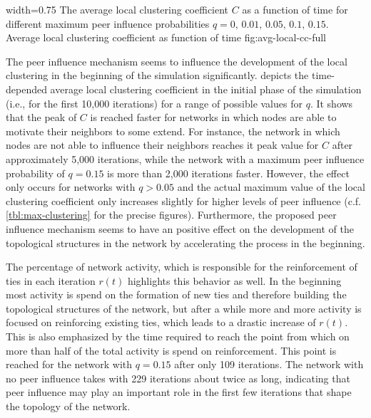      {width=0.75\textwidth}
      {The average local clustering coefficient \( C \) as a function of time for different maximum peer influence probabilities \( q = 0, \, 0.01, \, 0.05, \, 0.1, \, 0.15\). }
      {Average local clustering coefficient as function of time}
      {fig:avg-local-cc-full}


The peer influence mechanism seems to influence the development of the local clustering in the beginning of the simulation significantly.
 depicts the time-depended average local clustering coefficient in the initial phase of the simulation (i.e., for the first 10,000 iterations) for a range of possible values for \( q \).
It shows that the peak of \( C \) is reached faster for networks in which nodes are able to motivate their neighbors to some extend.
For instance, the network in which nodes are not able to influence their neighbors reaches it peak value for \( C \) after approximately 5,000 iterations, while the network with a maximum peer influence probability of \( q = 0.15 \) is more than 2,000 iterations faster.
However, the effect only occurs for networks with \( q > 0.05 \) and the actual maximum value of the local clustering coefficient only increases slightly for higher levels of peer influence (c.f. \cref{tbl:max-clustering} for the precise figures).
Furthermore, the proposed peer influence mechanism seems to have an positive effect on the development of the topological structures in the network by accelerating the process in the beginning.

The percentage of network activity, which is responsible for the reinforcement of ties in each iteration \( r(t) \) highlights this behavior as well.
In the beginning most activity is spend on the formation of new ties and therefore building the topological structures of the network, but after a while more and more activity is focused on reinforcing existing ties, which leads to a drastic increase of \( r(t) \).
This is also emphasized by the time required to reach the point from which on more than half of the total activity is spend on reinforcement.
This point is reached for the network with \( q = 0.15 \) after only 109 iterations.
The network with no peer influence takes with 229 iterations about twice as long, indicating that peer influence may play an important role in the first few iterations that shape the topology of the network.



